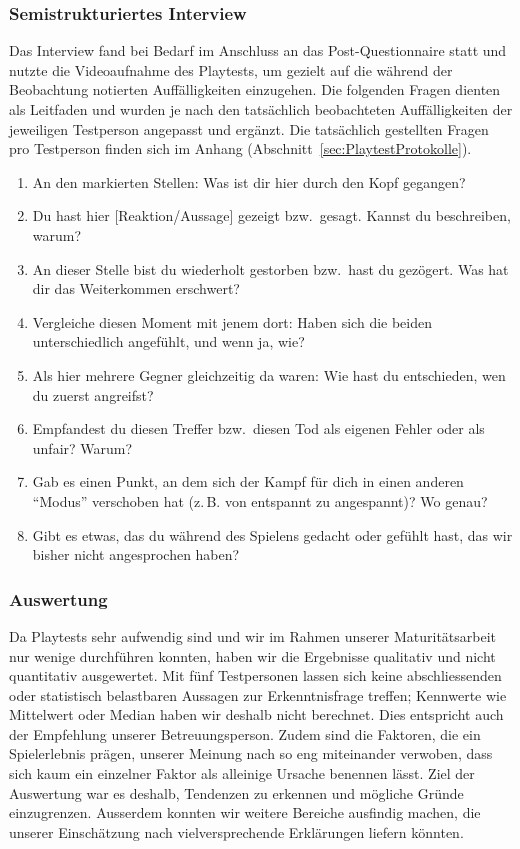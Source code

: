\documentclass[../Main.tex]{subfiles}
\begin{document}
\subsubsection{Semistrukturiertes Interview} \label{sec:Interview}

Das Interview fand bei Bedarf im Anschluss an das Post-Questionnaire statt und nutzte die Videoaufnahme des Playtests, um gezielt auf die während der Beobachtung notierten Auffälligkeiten einzugehen. Die folgenden Fragen dienten als Leitfaden und wurden je nach den tatsächlich beobachteten Auffälligkeiten der jeweiligen Testperson angepasst und ergänzt. Die tatsächlich gestellten Fragen pro Testperson finden sich im Anhang (Abschnitt~\ref{sec:PlaytestProtokolle}).

\begin{enumerate}[label=\textbf{I\arabic*}, leftmargin=1.5cm, itemsep=0.5em]
    \item An den markierten Stellen: Was ist dir hier durch den Kopf gegangen?
    \item Du hast hier [Reaktion/Aussage] gezeigt bzw.\ gesagt. Kannst du beschreiben, warum?
    \item An dieser Stelle bist du wiederholt gestorben bzw.\ hast du gezögert. Was hat dir das Weiterkommen erschwert?
    \item Vergleiche diesen Moment mit jenem dort: Haben sich die beiden unterschiedlich angefühlt, und wenn ja, wie?
    \item Als hier mehrere Gegner gleichzeitig da waren: Wie hast du entschieden, wen du zuerst angreifst?
    \item Empfandest du diesen Treffer bzw.\ diesen Tod als eigenen Fehler oder als unfair? Warum?
    \item Gab es einen Punkt, an dem sich der Kampf für dich in einen anderen \enquote{Modus} verschoben hat (z.\,B. von entspannt zu angespannt)? Wo genau?
    \item Gibt es etwas, das du während des Spielens gedacht oder gefühlt hast, das wir bisher nicht angesprochen haben?
\end{enumerate}

\subsubsection{Auswertung} \label{sec:Auswertung}
Da Playtests sehr aufwendig sind und wir im Rahmen unserer Maturitätsarbeit nur wenige durchführen konnten, haben wir die Ergebnisse qualitativ und nicht quantitativ ausgewertet. Mit fünf Testpersonen lassen sich keine abschliessenden oder statistisch belastbaren Aussagen zur Erkenntnisfrage treffen; Kennwerte wie Mittelwert oder Median haben wir deshalb nicht berechnet. Dies entspricht auch der Empfehlung unserer Betreuungsperson. Zudem sind die Faktoren, die ein Spielerlebnis prägen, unserer Meinung nach so eng miteinander verwoben, dass sich kaum ein einzelner Faktor als alleinige Ursache benennen lässt. Ziel der Auswertung war es deshalb, Tendenzen zu erkennen und mögliche Gründe einzugrenzen. Ausserdem konnten wir weitere Bereiche ausfindig machen, die unserer Einschätzung nach vielversprechende Erklärungen liefern könnten.
\end{document}
